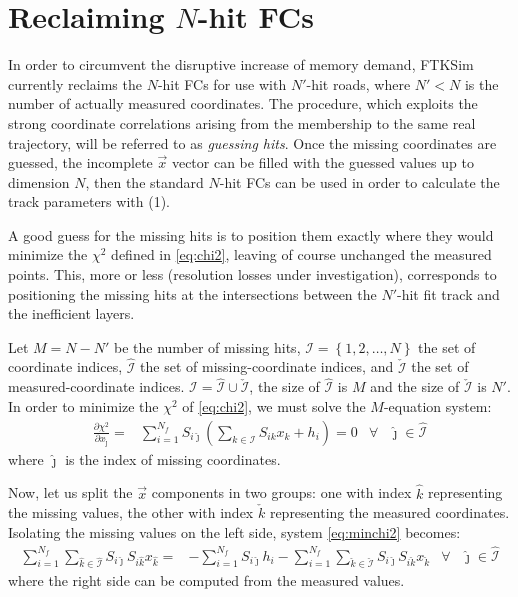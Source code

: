 \documentclass[a4paper,11pt]{article}
\begin{document}
\section{Reclaiming $N$-hit FCs}
\label{sec:formulas}

In order to circumvent the disruptive increase of memory demand,
FTKSim currently reclaims the $N$-hit FCs for use with
$N'$-hit roads, where $N' < N$ is the number of actually
measured coordinates.
The procedure, which exploits the strong coordinate correlations
arising from the membership to the same real trajectory, will be
referred to as {\em guessing hits}. Once the missing coordinates
are guessed, the incomplete $\vec x$ vector can be filled with
the guessed values up to dimension $N$, then the standard $N$-hit FCs
can be used in order to calculate the track parameters with (1).

A good guess for the missing hits is to position them exactly where
they would minimize the $\chi^2$ defined in \eqref{eq:chi2},
leaving of course unchanged the measured points.
This, more or less (resolution losses under investigation),
corresponds to positioning the missing hits at the intersections
between the $N'$-hit fit track and the inefficient layers.

Let $M = N-N'$ be the number of missing hits,
$\mathcal I = \left\{ 1,2,\ldots,N \right\}$ the set of coordinate indices,
$\hat{\mathcal I}$ the set of missing-coordinate indices,
and $\check{\mathcal I}$ the set of measured-coordinate indices.
$\mathcal I = \hat {\mathcal I} \cup \check {\mathcal I}$,
the size of $\hat{\mathcal I}$ is $M$
and the size of $\check{\mathcal I}$ is $N'$.
In order to minimize the $\chi^2$ of \eqref{eq:chi2},
we must solve the $M$-equation system:
\begin{align}
  \label{eq:minchi2}
  \frac {\partial \chi^2} {\partial x_{\hat \jmath}} =& \sum_{i=1}^{N_f}
  S_{i\hat \jmath}
  \left( \sum_{k \in \mathcal I} S_{ik} x_k+ h_i \right) = 0
  & \forall & \hat \jmath \in \hat{\mathcal I}
\end{align}
where $\hat \jmath$ is the index of missing coordinates.

Now, let us split
the $\vec x$ components in two groups: one with 
index $\hat k$ representing the missing values, the other with
index $\check k$ representing the measured coordinates.
Isolating the missing values on the left side,
system \eqref{eq:minchi2} becomes: 
\begin{align}
  \label{eq:minchi2_ext}
  \sum_{i=1}^{N_f} \sum_{\hat k \in \hat{\mathcal I}}
    S_{i\hat \jmath} S_{i\hat k} x_{\hat k} =
  & -\sum_{i=1}^{N_f} S_{i\hat \jmath}h_i
    -\sum_{i=1}^{N_f} \sum_{\check k \in \check{\mathcal I}}
    S_{i\hat \jmath} S_{i\check k} x_{\check k}
  & \forall & \hat \jmath \in \hat{\mathcal I}
\end{align}
where the right side can be computed from the measured values.
\end{document}
